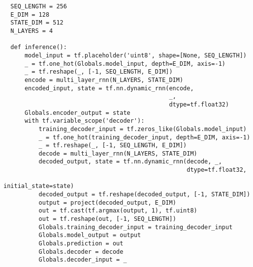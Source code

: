 \documentclass[10pt]{amsart}
\theoremstyle{definition}
\begin{document}
\begin{verbatim}
  SEQ_LENGTH = 256
  E_DIM = 128
  STATE_DIM = 512
  N_LAYERS = 4

  def inference():
      model_input = tf.placeholder('uint8', shape=[None, SEQ_LENGTH])
      _ = tf.one_hot(Globals.model_input, depth=E_DIM, axis=-1)
      _ = tf.reshape(_, [-1, SEQ_LENGTH, E_DIM])
      encode = multi_layer_rnn(N_LAYERS, STATE_DIM)
      encoded_input, state = tf.nn.dynamic_rnn(encode,
                                               _,
                                               dtype=tf.float32)
      Globals.encoder_output = state
      with tf.variable_scope('decoder'):
          training_decoder_input = tf.zeros_like(Globals.model_input)
          _ = tf.one_hot(training_decoder_input, depth=E_DIM, axis=-1)
          _ = tf.reshape(_, [-1, SEQ_LENGTH, E_DIM])
          decode = multi_layer_rnn(N_LAYERS, STATE_DIM)
          decoded_output, state = tf.nn.dynamic_rnn(decode, _,
                                                    dtype=tf.float32,
                                                    initial_state=state)
          decoded_output = tf.reshape(decoded_output, [-1, STATE_DIM])
          output = project(decoded_output, E_DIM)
          out = tf.cast(tf.argmax(output, 1), tf.uint8)
          out = tf.reshape(out, [-1, SEQ_LENGTH])
          Globals.training_decoder_input = training_decoder_input
          Globals.model_output = output
          Globals.prediction = out
          Globals.decoder = decode
          Globals.decoder_input = _
\end{verbatim}
\end{document}
